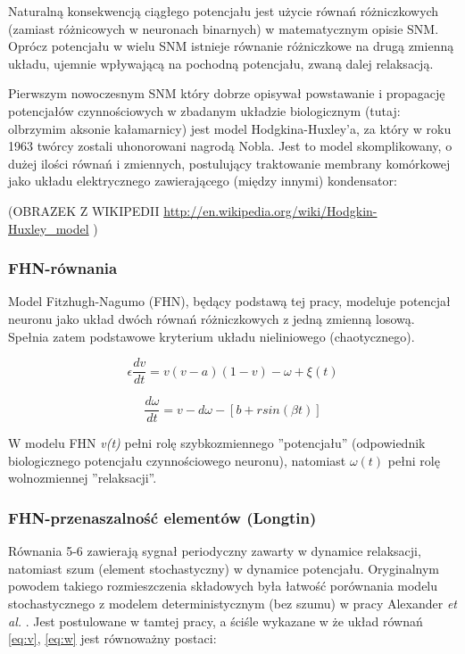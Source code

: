\documentclass[12pt]{article}
\begin{document}
  Naturalną konsekwencją ciągłego potencjału jest użycie równań różniczkowych (zamiast różnicowych w neuronach binarnych) w matematycznym opisie SNM. Oprócz potencjału w wielu SNM istnieje równanie różniczkowe na drugą zmienną układu, ujemnie wpływającą na pochodną potencjału, zwaną dalej relaksacją.
  
  Pierwszym nowoczesnym SNM który dobrze opisywał powstawanie i propagację potencjałów czynnościowych w zbadanym układzie biologicznym (tutaj: olbrzymim aksonie kałamarnicy) jest model Hodgkina-Huxley'a, za który w roku 1963 twórcy zostali uhonorowani nagrodą Nobla. Jest to model skomplikowany, o dużej ilości równań i zmiennych, postulujący traktowanie membrany komórkowej jako układu elektrycznego zawierającego (między innymi) kondensator:
  
  (OBRAZEK Z WIKIPEDII \url{http://en.wikipedia.org/wiki/Hodgkin-Huxley_model} )

  \subsubsection{FHN-równania}

  Model Fitzhugh-Nagumo (FHN), będący podstawą tej pracy, modeluje potencjał neuronu jako układ dwóch równań różniczkowych z jedną zmienną losową. Spełnia zatem podstawowe kryterium układu nieliniowego (chaotycznego).

  \begin{equation} \label{eq:v}
    \epsilon \frac{dv}{dt} = v(v-a)(1-v)- \omega + \xi(t)
  \end{equation}

  \begin{equation} \label{eq:w}
    \frac{d \omega}{dt} = v - d \omega - [b + r sin(\beta t)]
  \end{equation}

  W modelu FHN \emph{v(t)} pełni rolę szybkozmiennego ''potencjału'' (odpowiednik biologicznego potencjału czynnościowego neuronu), natomiast $\omega (t)$ pełni rolę wolnozmiennej ''relaksacji''.

  \subsubsection{FHN-przenaszalność elementów (Longtin)}

  Równania 5-6 zawierają sygnał periodyczny zawarty w dynamice relaksacji, natomiast szum (element stochastyczny) w dynamice potencjału. Oryginalnym powodem takiego rozmieszczenia składowych była łatwość porównania modelu stochastycznego z modelem deterministycznym (bez szumu) w pracy Alexander \emph{et al.} \cite{alexander}. Jest postulowane w tamtej pracy, a ściśle wykazane w \cite{longtin} że układ równań \ref{eq:v}, \ref{eq:w} jest równoważny postaci:
\end{document}
